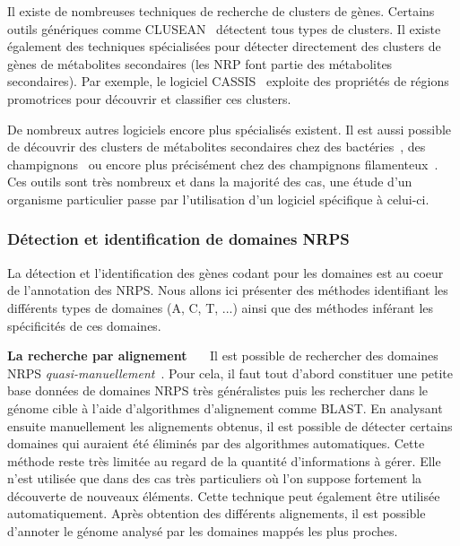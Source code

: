 Il existe de nombreuses techniques de recherche de clusters de gènes.
Certains outils génériques comme CLUSEAN~\cite{weber_clusean:_2009} détectent tous types de clusters.
Il existe également des techniques spécialisées pour détecter directement des clusters de gènes de métabolites secondaires (les NRP font partie des métabolites secondaires).
Par exemple, le logiciel CASSIS~\cite{wolf_cassis_2016} exploite des propriétés de régions promotrices pour découvrir et classifier ces clusters.

De nombreux autres logiciels encore plus spécialisés existent.
Il est aussi possible de découvrir des clusters de métabolites secondaires chez des bactéries~\cite{cruz-morales_recapitulation_2015}, des champignons~\cite{khaldi_smurf:_2010} ou encore plus précisément chez des champignons filamenteux~\cite{andersen_accurate_2013,umemura_motif-independent_2015}.
Ces outils sont très nombreux et dans la majorité des cas, une étude d'un organisme particulier passe par l'utilisation d'un logiciel spécifique à celui-ci.


\subsubsection{Détection et identification de domaines NRPS}

La détection et l'identification des gènes codant pour les domaines est au coeur de l'annotation des NRPS.
Nous allons ici présenter des méthodes identifiant les différents types de domaines (A, C, T, ...) ainsi que des méthodes inférant les spécificités de ces domaines.

\textbf{La recherche par alignement}~~~
Il est possible de rechercher des domaines NRPS \textit{quasi-manuellement}~\cite{bachmann_chapter_2009}.
Pour cela, il faut tout d'abord constituer une petite base données de domaines NRPS très généralistes puis les rechercher dans le génome cible à l'aide d'algorithmes d'alignement comme BLAST.
En analysant ensuite manuellement les alignements obtenus, il est possible de détecter certains domaines qui auraient été éliminés par des algorithmes automatiques.
Cette méthode reste très limitée au regard de la quantité d'informations à gérer.
Elle n'est utilisée que dans des cas très particuliers où l'on suppose fortement la découverte de nouveaux éléments.
Cette technique peut également être utilisée automatiquement.
Après obtention des différents alignements, il est possible d'annoter le génome analysé par les domaines mappés les plus proches.

